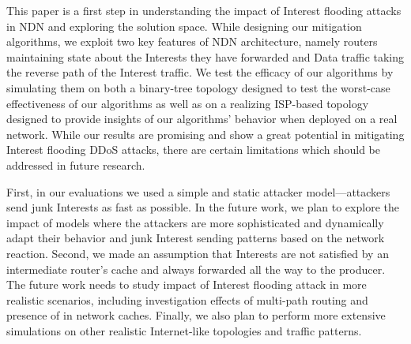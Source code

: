
This paper is a first step in understanding the impact of Interest flooding attacks in NDN and exploring the solution space. 
While designing our mitigation algorithms, we exploit two key features of NDN architecture, namely routers maintaining state about the Interests they have forwarded and Data traffic taking the reverse path of the Interest traffic. 
We test the efficacy of our algorithms by simulating them on both a binary-tree topology designed to test the worst-case effectiveness of our algorithms as well as on a realizing ISP-based topology designed to provide insights of our algorithms' behavior when deployed on a real network. 
While our results are promising and show a great potential in mitigating Interest flooding DDoS attacks, there are certain limitations which should be addressed in future research. 

First, in our evaluations we used a simple and static attacker model---attackers send junk Interests as fast as possible. 
In the future work, we plan to explore the impact of models where the attackers are more sophisticated and dynamically adapt their behavior and junk Interest sending patterns based on the network reaction. 
Second, we made an assumption that Interests are not satisfied by an intermediate router's cache and always forwarded all the way to the producer.  
The future work needs to study impact of Interest flooding attack in more realistic scenarios, including investigation effects of multi-path routing and presence of in network caches.
Finally, we also plan to perform more extensive simulations on other realistic Internet-like topologies and traffic patterns.



